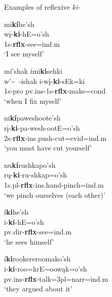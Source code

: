 \begin{exe}
\item\label{reflexiveexamples} Examples of reflexive \textit{ki-}

	\begin{xlist}
	
	\item \glll mi\textbf{kí}he'sh\\
	wį-\textbf{ki}-hE=o'sh\\
	1s-\textbf{rflx}-\textnormal{see}=ind.m\\
	\glt `I see myself' \citep[23]{mixco1997a}
	
	\item \glll mí'shak ími\textbf{ki}sehki\\
	w'\~~-ishak i-wį-\textbf{ki}-sEk=ki\\
	1s-pro pv.ins-1s-\textbf{rflx}-\textnormal{make}=cond\\
	\glt `when I fix myself' \citep[127]{hollow1970}
	
	\item \glll ni\textbf{kí}paweshoote'sh\\
	rį-\textbf{ki}-pa-wesh-ootE=o'sh\\
	2s-\textbf{rflx}-ins.push-\textnormal{cut}=evid=ind.m\\
	\glt `you must have cut yourself' \citep[11]{kennard1936}
	
	\item \glll nu\textbf{kí}rushkapo'sh\\
	rų-\textbf{ki}-ru-shkap=o'sh\\
	1s.pl-\textbf{rflx}-ins.hand-\textnormal{pinch}=ind.m\\
	\glt `we pinch ourselves (each other)' \citep[440]{hollow1970}
	
	\item \glll í\textbf{ki}he'sh\\
	i-\textbf{ki}-hE=o'sh\\
	pv.dir-\textbf{rflx}-\textnormal{see}=ind.m\\
	\glt `he sees himself' \citep[440]{hollow1970}
	
	\item \glll í\textbf{ki}rookereroomako'sh\\
	i-\textbf{ki}-roo=krE=oowąk=o'sh\\
	pv.ins-\textbf{rflx}-\textnormal{talk}=3pl=narr=ind.m\\
	\glt `they argued about it' \citep[24]{hollow1973a}
	
	\end{xlist}

\end{exe}


